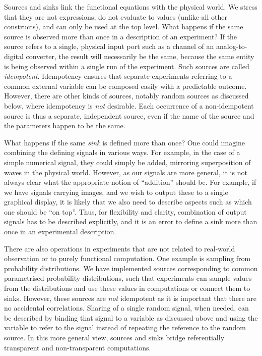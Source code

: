 Sources and sinks 
%
%
link the functional equations with the physical world. We stress that they are
not expressions, do not evaluate to values (unlike all other
constructs), and can only be used at the top level. What happens if the
same source is observed more than once in a description of an
experiment?  If the source refers to a single, physical input port
such as a channel of an analog-to-digital converter, the result will
necessarily be the same, because the same entity is being observed
within a single run of the experiment. Such sources are called
\emph{idempotent}.  Idempotency ensures that separate experiments
referring to a common external variable can be composed easily with a
predictable outcome. However, there are other kinds of sources,
notably random sources as discussed below, where idempotency is
\emph{not} desirable. Each occurrence of a non-idempotent source is
thus a separate, independent source, even if the name of the source
and the parameters happen to be the same.

What happens if the same \emph{sink} is defined more than once? One could
imagine combining the defining signals in various ways. For example, in the
case of a simple numerical signal, they could simply be added, mirroring
superposition of waves in the physical world. However, as our signals are more
general, it is not always clear what the appropriate notion of ``addition''
should be. For example, if we have signals carrying images, and we wish to
output these to a single graphical display, it is likely that we also need to
describe aspects such as which one should be ``on top''. Thus, for flexibility
and clarity, combination of output signals has to be described explicitly, and
it is an error to define a sink more than once in an experimental description.

There are also operations in experiments that are not related to real-world
observation or to purely functional computation. One example is sampling from
probability distributions. We have implemented sources corresponding to common
parametrised probability distributions, such that experiments can sample
values from the distributions and use these values in computations or
connect them to sinks. However, these sources are \emph{not} idempotent as it
is important that there are no accidental correlations. Sharing of a single random
signal, when needed, can  be described by binding that signal to a
variable as discussed above and using the variable to refer to the signal
instead of repeating the reference to the random source. In this more general
view, sources and sinks bridge referentially transparent and non-transparent
computations.

